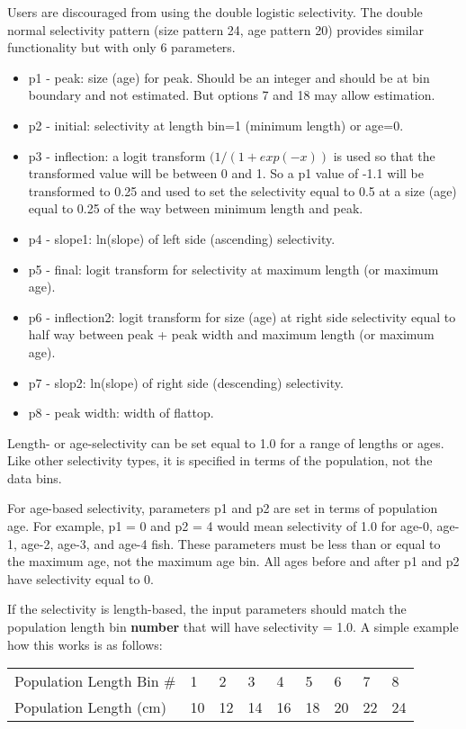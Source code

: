 Users are discouraged from using the double logistic selectivity. The double normal selectivity pattern (size pattern 24, age pattern 20) provides similar functionality but with only 6 parameters.
	\begin{itemize}
		\item p1 - peak: size (age) for peak. Should be an integer and should be at bin boundary and not estimated. But options 7 and 18 may allow estimation.
		\item p2 - initial: selectivity at length bin=1 (minimum length) or age=0.
		\item p3 - inflection: a logit transform $(1/(1+exp(-x))$ is used so that the transformed value will be between 0 and 1. So a p1 value of -1.1 will be transformed to 0.25 and used to set the selectivity equal to 0.5 at a size (age) equal to 0.25 of the way between minimum length and peak. 
		\item p4 - slope1: ln(slope) of left side (ascending) selectivity.
		\item p5 - final: logit transform for selectivity at maximum length (or maximum age).
		\item p6 - inflection2: logit transform for size (age) at right side selectivity equal to half way between peak + peak width and maximum length (or maximum age).
		\item p7 - slop2: ln(slope) of right side (descending) selectivity.
		\item p8 - peak width: width of flattop.
	\end{itemize}
	
Length- or age-selectivity can be set equal to 1.0 for a range of lengths or ages. Like other selectivity types, it is specified in terms of the population, not the data bins.

For age-based selectivity, parameters p1 and p2 are set in terms of population age. For example, p1 = 0 and p2 = 4 would mean selectivity of 1.0 for age-0, age-1, age-2, age-3, and age-4 fish. These parameters must be less than or equal to the maximum age, not the maximum age bin. All ages before and after p1 and p2 have selectivity equal to 0.

If the selectivity is length-based, the input parameters should match the population length bin \textbf{number} that will have selectivity = 1.0. A simple example how this works is as follows:

\begin{longtable}{p{4cm} p{0.9cm} p{0.9cm} p{0.9cm} p{0.9cm} p{0.9cm} p{0.9cm} p{0.9cm} p{0.9cm}}
	\hline	
	Population Length Bin \# \Tstrut & 1 & 2 & 3 & 4 & 5 & 6 & 7 & 8 \\
	Population Length (cm)      & 10 & 12 & 14 & 16 & 18 & 20 & 22 & 24 \Bstrut\\
	\hline
\end{longtable} 

